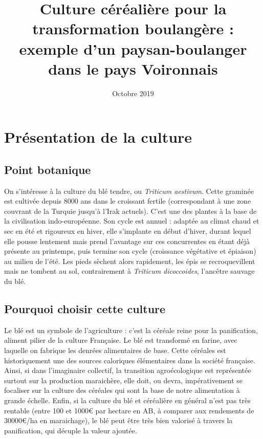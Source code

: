 \documentclass{article}
\title{Culture céréalière pour la transformation boulangère : exemple d'un paysan-boulanger dans le pays Voironnais}
\date{Octobre 2019}
\begin{document}
\maketitle

\section{Présentation de la culture}

\subsection{Point botanique}

On s'intéresse à la culture du blé tendre, ou \textit{Triticum aestivum}. Cette graminée est cultivée depuis 8000 ans dans le croissant fertile (correspondant à une zone couvrant de la Turquie jusqu'à l'Irak actuels). C'est une des plantes à la base de la civilisation indo-européenne. Son cycle est annuel : adaptée au climat chaud et sec en été et rigoureux en hiver, elle s'implante en début d'hiver, durant lequel elle pousse lentement mais prend l'avantage sur ces concurrentes en étant déjà présente au printemps, puis termine son cycle (croissance végétative et épiaison) au milieu de l'été. Les pieds sèchent alors rapidement, les épis se recroquevillent mais ne tombent au sol, contrairement à \textit{Triticum dicoccoides}, l'ancêtre sauvage du blé. 

\subsection{Pourquoi choisir cette culture}

Le blé est un symbole de l'agriculture : c'est la céréale reine pour la panification, aliment pilier de la culture Française. Le blé est transformé en farine, avec laquelle on fabrique les denrées alimentaires de base. Cette céréales est historiquement une des sources caloriques élémentaires dans la société française. Ainsi, si dans l'imaginaire collectif, la transition agroécologique est représentée surtout sur la production maraichère, elle doit, ou devra, impérativement se focaliser sur la culture des céréales qui sont la base de notre alimentation à grande échelle. Enfin, si la culture du blé et céréalière en général n'est pas très rentable (entre 100 et 1000\euro{} par hectare en AB, à comparer aux rendements de 30000\euro{}/ha en maraichage), le blé peut être très bien valorisé à travers la panification, qui décuple la valeur ajoutée. 
\end{document}
